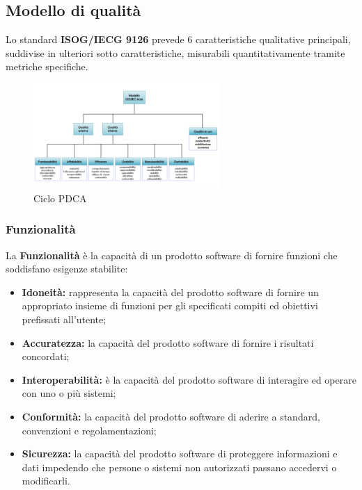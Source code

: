 \begin{flushleft}
\subsection{Modello di qualità}
Lo standard \textbf{ISOG/IECG 9126}
prevede 6 caratteristiche qualitative principali, suddivise in ulteriori sotto caratteristiche, misurabili quantitativamente tramite metriche specifiche.

\begin{figure}[h]
\centering
\includegraphics[height= 4cm] {./img/ISO_IEC_9126.png}
\caption{Ciclo PDCA}
\end{figure}

\subsubsection{Funzionalità}
La \textbf{Funzionalità} è la capacità di un prodotto software di fornire funzioni che soddisfano esigenze stabilite:

\begin{itemize}
	\item \textbf{Idoneità:}  rappresenta la capacità del prodotto software di fornire un appropriato insieme di funzioni per gli specificati compiti ed obiettivi prefissati all'utente;
	\item \textbf{Accuratezza:} la capacità del prodotto software di fornire i risultati concordati;
	\item \textbf{Interoperabilità:} è la capacità del prodotto software di interagire ed operare con uno o più sistemi;
	\item \textbf{Conformità:} la capacità del prodotto software di aderire a standard, convenzioni e regolamentazioni;
	\item \textbf{Sicurezza:} la capacità del prodotto software di proteggere informazioni e dati impedendo che persone o sistemi non autorizzati passano accedervi o modificarli.
\end{itemize}


\end{flushleft}
